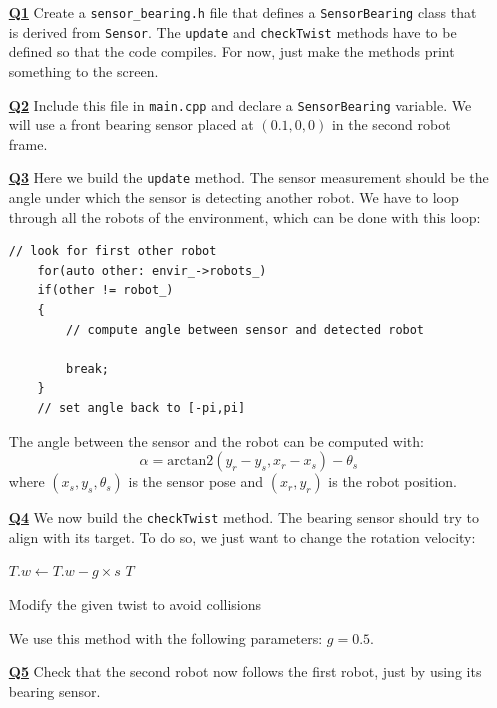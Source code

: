 \documentclass{ecnreport}
\begin{document}
\begin{itemize}
\medskip\item[\textbf{\underline{Q1}}] Create a \texttt{sensor\_bearing.h} file that defines a \texttt{SensorBearing} class that is derived from \texttt{Sensor}. The \texttt{update} and \texttt{checkTwist} methods have to be defined so that the code compiles. For now, just make the methods print something to the screen.

\medskip\item[\textbf{\underline{Q2}}] Include this file in \texttt{main.cpp} and declare a \texttt{SensorBearing} variable.  We will use a front bearing sensor placed at $(0.1, 0,0)$ in the second robot frame.

\medskip\item[\textbf{\underline{Q3}}] Here we build the \texttt{update} method. The sensor measurement should be the angle under which the sensor is detecting another robot. 
We have to loop through all the robots of the environment, which can be done with this loop:
\begin{center}\cppstyle
\begin{lstlisting}
// look for first other robot
    for(auto other: envir_->robots_)
	if(other != robot_)
	{
	    // compute angle between sensor and detected robot
	    
	    break;
	}
    // set angle back to [-pi,pi]
\end{lstlisting}
\end{center}
The angle between the sensor and the robot can be computed with:
\begin{equation*}
 \alpha = \text{arctan2}(y_r - y_s, x_r-x_s) - \theta_s
\end{equation*}where $(x_s,y_s,\theta_s)$ is the sensor pose and $(x_r,y_r)$ is the robot position.

\medskip\item[\textbf{\underline{Q4}}] We now build the \texttt{checkTwist} method. The bearing sensor should try to align with its target. To do so, we just want to change the rotation velocity:
\begin{algorithm}[!h]
{}
$T.w \gets T.w - g\times s$\;
\Return $T$
\caption{Modify the given twist to avoid collisions}
\label{algo:bearing}
\end{algorithm}

We use this method with the following parameters: $g = 0.5$.


\medskip\item[\textbf{\underline{Q5}}] Check that the second robot now follows the first robot, just by using its bearing sensor. 

\end{itemize}
\end{document}
